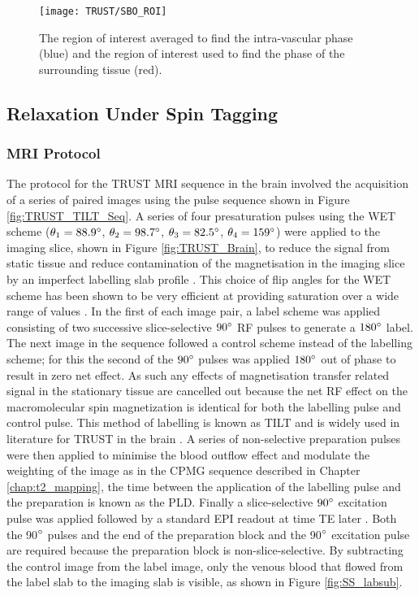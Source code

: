 \begin{figure}[H]
	\centering
	\texttt{[image: TRUST/SBO\_ROI]}
	\caption{The region of interest averaged to find the intra-vascular phase (blue) and the region of interest used to find the phase of the surrounding tissue (red).}
	\label{fig:SBO_ROI}	
\end{figure}


\subsection{\ttwo Relaxation Under Spin Tagging}

\subsubsection{\ac{MRI} Protocol}
\label{sec:TRUST_MRI}

The protocol for the \ac{TRUST} \ac{MRI} sequence in the brain involved the acquisition of a series of paired images using the pulse sequence shown in Figure \ref{fig:TRUST_TILT_Seq}. A series of four presaturation pulses using the \ac{WET} scheme ($\theta_1 = 88.9\degree$, $\theta_2 = 98.7\degree$, $\theta_3 = 82.5\degree$, $\theta_4 = 159\degree$) were applied to the imaging slice, shown in Figure \ref{fig:TRUST_Brain}, to reduce the signal from static tissue and reduce contamination of the magnetisation in the imaging slice by an imperfect labelling slab profile \cite{hendrikse_measurements_2003}. This choice of flip angles for the \ac{WET} scheme has been shown to be very efficient at providing saturation over a wide range of \tone values \cite{golay_pulsed_2005}. In the first of each image pair, a label scheme was applied consisting of two successive slice-selective $90\degree$ \ac{RF} pulses to generate a $180\degree$ label. The next image in the sequence followed a control scheme instead of the labelling scheme; for this the second of the $90\degree$ pulses was applied $180\degree$ out of phase to result in zero net effect. As such any effects of magnetisation transfer related signal in the stationary tissue are cancelled out because the net \ac{RF} effect on the macromolecular spin magnetization is identical for both the labelling pulse and control pulse. This method of labelling is known as \ac{TILT} and is widely used in literature for \ac{TRUST} in the brain \cite{golay_transfer_1999}. A series of non-selective \ttwo preparation pulses were then applied to minimise the blood outflow effect and modulate the \ttwo weighting of the image as in the \ac{CPMG} sequence described in Chapter \ref{chap:t2_mapping}, the time between the application of the labelling pulse and the \ttwo preparation is known as the \ac{PLD}. Finally a slice-selective $90\degree$ excitation pulse was applied followed by a standard \ac{EPI} readout at time \ac{TE} later \cite{xu_improving_2012}. Both the 90$\degree$ pulses and the end of the \ttwo preparation block and the 90$\degree$ excitation pulse are required because the \ttwo preparation block is non-slice-selective. By subtracting the control image from the label image, only the venous blood that flowed from the label slab to the imaging slab is visible, as shown in Figure \ref{fig:SS_labsub}.

